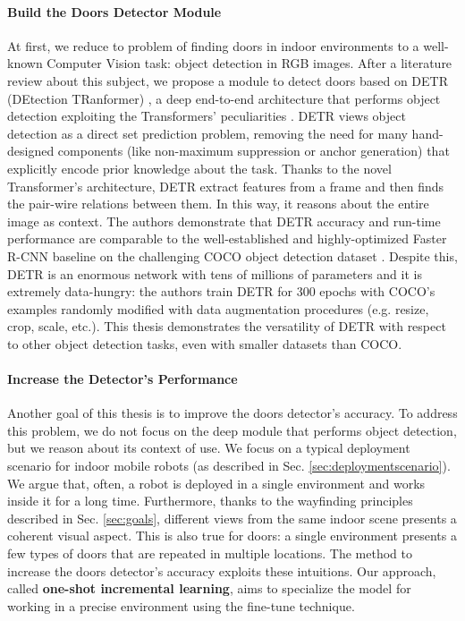 \paragraph{Build the Doors Detector Module} At first, we reduce to problem of finding doors in indoor environments to a well-known Computer Vision task: object detection in RGB images. After a literature review about this subject, we propose a module to detect doors based on DETR (DEtection TRanformer) \cite{detr}, a deep end-to-end architecture that performs object detection exploiting the Transformers' peculiarities \cite{transformer}. DETR views object detection as a direct set prediction problem, removing the need for many hand-designed components (like non-maximum suppression or anchor generation) that explicitly encode prior knowledge about the task. Thanks to the novel Transformer's architecture, DETR extract features from a frame and then finds the pair-wire relations between them. In this way, it reasons about the entire image as context. The authors demonstrate that DETR accuracy and run-time performance are comparable to the well-established and highly-optimized Faster R-CNN baseline \cite{fasterrcnn} on the challenging COCO object detection dataset \cite{coco}. Despite this, DETR is an enormous network with tens of millions of parameters and it is extremely data-hungry: the authors train DETR for 300 epochs with COCO's examples randomly modified with data augmentation procedures (e.g. resize, crop, scale, etc.). This thesis demonstrates the versatility of DETR with respect to other object detection tasks, even with smaller datasets than COCO.

\paragraph{Increase the Detector's Performance} Another goal of this thesis is to improve the doors detector's accuracy. To address this problem, we do not focus on the deep module that performs object detection, but we reason about its context of use. We focus on a typical deployment scenario for indoor mobile robots (as described in Sec. \ref{sec:deploymentscenario}). We argue that, often, a robot is deployed in a single environment and works inside it for a long time. Furthermore, thanks to  the wayfinding principles described in Sec. \ref{sec:goals}, different views from the same indoor scene presents a coherent visual aspect. This is also true for doors: a single environment presents a few types of doors that are repeated in multiple locations. The method to increase the doors detector's accuracy exploits these intuitions. Our approach, called \textbf{one-shot incremental learning}, aims to specialize the model for working in a precise environment using the fine-tune technique. 

